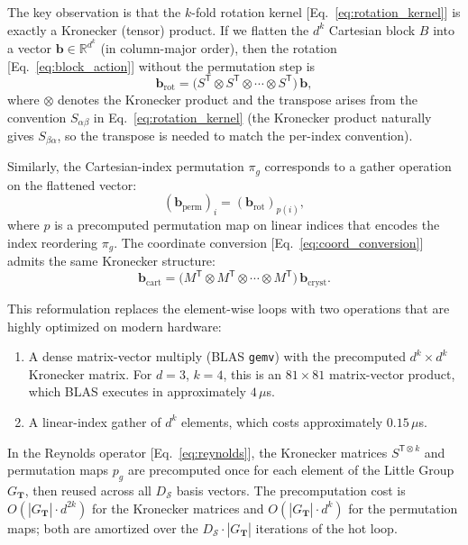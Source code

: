 \documentclass[twocolumn,amsmath,amssymb,aps,prb,10pt,floatfix]{revtex4-2}
\newcommand{\vT}{\mathbf{T}}
\begin{document}
The key observation is that the $k$-fold rotation kernel [Eq.~\eqref{eq:rotation_kernel}] is exactly a Kronecker (tensor) product.
If we flatten the $d^k$ Cartesian block $B$ into a vector $\mathbf{b} \in \mathbb{R}^{d^k}$ (in column-major order), then the rotation [Eq.~\eqref{eq:block_action}] without the permutation step is
\begin{equation}
\mathbf{b}_{\mathrm{rot}}
= \bigl(S^{\mathsf{T}} \otimes S^{\mathsf{T}} \otimes \cdots \otimes S^{\mathsf{T}}\bigr)\, \mathbf{b},
\label{eq:kron_rotation}
\end{equation}
where $\otimes$ denotes the Kronecker product and the transpose arises from the convention $S_{\alpha\beta}$ in Eq.~\eqref{eq:rotation_kernel} (the Kronecker product naturally gives $S_{\beta\alpha}$, so the transpose is needed to match the per-index convention).

Similarly, the Cartesian-index permutation $\pi_g$ corresponds to a gather operation on the flattened vector:
\begin{equation}
(\mathbf{b}_{\mathrm{perm}})_i = (\mathbf{b}_{\mathrm{rot}})_{p(i)},
\label{eq:gather_perm}
\end{equation}
where $p$ is a precomputed permutation map on linear indices that encodes the index reordering $\pi_g$.
The coordinate conversion [Eq.~\eqref{eq:coord_conversion}] admits the same Kronecker structure:
\begin{equation}
\mathbf{b}_{\mathrm{cart}}
= \bigl(M^{\mathsf{T}} \otimes M^{\mathsf{T}} \otimes \cdots \otimes M^{\mathsf{T}}\bigr)\, \mathbf{b}_{\mathrm{cryst}}.
\label{eq:kron_conversion}
\end{equation}

This reformulation replaces the element-wise loops with two operations that are highly optimized on modern hardware:
\begin{enumerate}
\item A dense matrix-vector multiply (BLAS \texttt{gemv}) with the precomputed $d^k \times d^k$ Kronecker matrix.
For $d=3$, $k=4$, this is an $81 \times 81$ matrix-vector product, which BLAS executes in approximately $4\,\mu$s.
\item A linear-index gather of $d^k$ elements, which costs approximately $0.15\,\mu$s.
\end{enumerate}
In the Reynolds operator [Eq.~\eqref{eq:reynolds}], the Kronecker matrices $S^{\mathsf{T}\otimes k}$ and permutation maps $p_g$ are precomputed once for each element of the Little Group $G_{\vT}$, then reused across all $D_{\mathcal{S}}$ basis vectors.
The precomputation cost is $O(|G_{\vT}| \cdot d^{2k})$ for the Kronecker matrices and $O(|G_{\vT}| \cdot d^k)$ for the permutation maps; both are amortized over the $D_{\mathcal{S}} \cdot |G_{\vT}|$ iterations of the hot loop.
\end{document}
